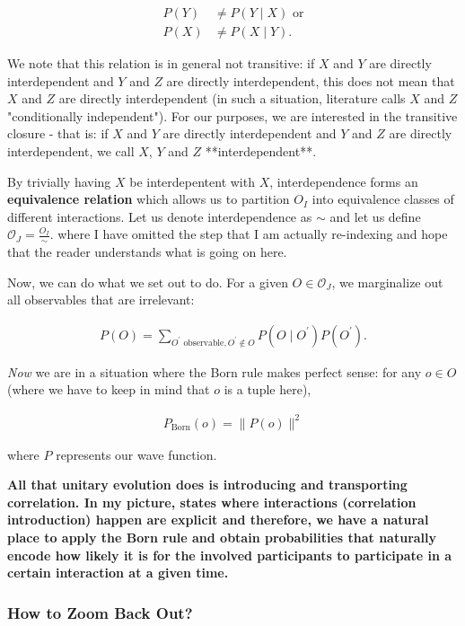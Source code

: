 \documentclass{article}
\begin{document}
\begin{align*}
P(Y) &\neq P(Y\mid X) \text{ or} \\
P(X) &\neq P(X\mid Y).
\end{align*}

We note that this relation is in general not transitive: if $X$ and $Y$ are directly interdependent and $Y$ and $Z$ are directly interdependent, this does not mean that $X$ and $Z$ are directly interdependent (in such a situation, literature calls $X$ and $Z$ "conditionally independent"). For our purposes, we are interested in the transitive closure - that is: if $X$ and $Y$ are directly interdependent and $Y$ and $Z$ are directly interdependent, we call $X$, $Y$ and $Z$ **interdependent**.

By trivially having $X$ be interdepentent with $X$, interdependence forms an \textbf{equivalence relation} which allows us to partition $O_I$ into equivalence classes of different interactions. Let us denote interdependence as $\sim$ and let us define $\mathcal{O}_J = \frac{O_I}{\sim}$. where I have omitted the step that I am actually re-indexing and hope that the reader understands what is going on here.

Now, we can do what we set out to do. For a given $O\in\mathcal{O}_J$, we marginalize out all observables that are irrelevant:

\begin{align*}
P(O) = \sum_{O^\prime \text{ observable}, O^\prime \notin O} P(O\mid O^\prime) P(O^\prime).
\end{align*}

\textit{Now} we are in a situation where the Born rule makes perfect sense: for any $o\in O$ (where we have to keep in mind that $o$ is a tuple here),

\begin{align*}
P_{\text{Born}}(o) = \|P(o)\|^2
\end{align*}

where $P$ represents our wave function.

\textbf{All that unitary evolution does is introducing and transporting correlation. In my picture, states where interactions (correlation introduction) happen are explicit and therefore, we have a natural place to apply the Born rule and obtain probabilities that naturally encode how likely it is for the involved participants to participate in a certain interaction at a given time.}

\subsubsection{How to Zoom Back Out?}
\end{document}
